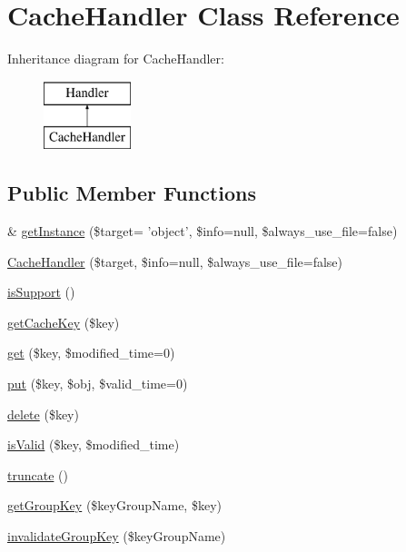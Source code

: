 \hypertarget{classCacheHandler}{\section{Cache\-Handler Class Reference}
\label{classCacheHandler}
}
Inheritance diagram for Cache\-Handler\-:\begin{figure}[H]
\begin{center}
\leavevmode
\includegraphics[height=2.000000cm]{classCacheHandler}
\end{center}
\end{figure}
\subsection*{Public Member Functions}
\begin{DoxyCompactItemize}
\item 
\& \hyperlink{classCacheHandler_a2fce85cb82ab180ce9d6bcea61a54eec}{get\-Instance} (\$target= 'object', \$info=null, \$always\-\_\-use\-\_\-file=false)
\item 
\hyperlink{classCacheHandler_a71cb13c8791b73a8153fd5bbc7aba3e3}{Cache\-Handler} (\$target, \$info=null, \$always\-\_\-use\-\_\-file=false)
\item 
\hyperlink{classCacheHandler_a4c137721670e0e9ce1d60bdd2f7235bb}{is\-Support} ()
\item 
\hyperlink{classCacheHandler_ab849392ce5ea0d57208f39d8a6a4fa43}{get\-Cache\-Key} (\$key)
\item 
\hyperlink{classCacheHandler_af726ae7803e5a73dee47bb43fc1fb8fc}{get} (\$key, \$modified\-\_\-time=0)
\item 
\hyperlink{classCacheHandler_af7fe9532fb10504cee980d7581a31995}{put} (\$key, \$obj, \$valid\-\_\-time=0)
\item 
\hyperlink{classCacheHandler_af51c1473c877ab5e20336d0d719c27d7}{delete} (\$key)
\item 
\hyperlink{classCacheHandler_aea9da5e2293a9062bc7a5f0a4104c9ce}{is\-Valid} (\$key, \$modified\-\_\-time)
\item 
\hyperlink{classCacheHandler_a10046e23ee8c8ef41bbbb69b2dda7889}{truncate} ()
\item 
\hyperlink{classCacheHandler_ab777b6b22477848324a25346da869596}{get\-Group\-Key} (\$key\-Group\-Name, \$key)
\item 
\hyperlink{classCacheHandler_a43118f91508ad5695a13f7a332cc9389}{invalidate\-Group\-Key} (\$key\-Group\-Name)
\end{DoxyCompactItemize}
